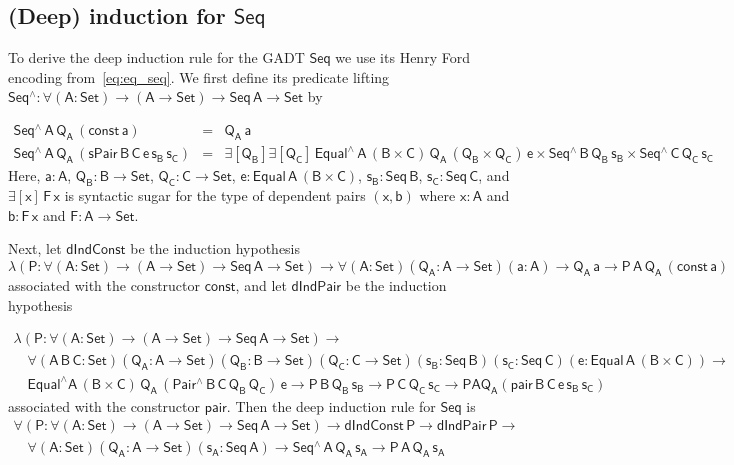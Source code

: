 \documentclass[9pt]{entcs}
\begin{document}
\subsection{(Deep) induction for $\mathsf{Seq}$}\label{sec:ind-seq}

To derive the deep induction rule for the GADT $\mathsf{Seq}$ we use
its Henry Ford encoding from~\eqref{eq:eq_seq}.  We first define its
predicate lifting $\mathsf{Seq^\wedge : \forall (A : Set) \to (A \to
  Set) \to Seq\,A \to Set}$ by

\vspace*{-0.2in}

\[\begin{array}{lll}
\mathsf{Seq^{\wedge}\,A\,Q_A\,(const\,a)} & = & \mathsf{Q_A\,a}\\
\mathsf{Seq^{\wedge}\,A\,Q_A\,(sPair\,B\,C\,e\,s_B\,s_C)}
&=&\mathsf{\exists [Q_B] \exists [Q_C]\, Equal^{\wedge}\,A\, (B
  \times C)\, Q_A\, (Q_B \times Q_C) \, e \times
  Seq^{\wedge}\,B\,Q_B\,s_B \times Seq^{\wedge}\,C\,Q_C\,s_C}
\end{array}\]
Here, $\mathsf{a : A}$, $\mathsf{Q_B : B \to Set}$, $\mathsf{Q_C : C
  \to Set}$, $\mathsf{e : Equal\,A\,(B \times C)}$, $\mathsf{s_B :
  Seq\,B}$, $\mathsf{s_C : Seq\,C}$, and $\mathsf{\exists [x]\, F
  \,x}$ is syntactic sugar for the type of dependent pairs
$\mathsf{(x,b)}$ where $\mathsf{x : A}$ and $\mathsf{b : F\, x}$ and
$\mathsf{F : A \to Set}$.

Next, let $\mathsf{dIndConst}$ be the induction hypothesis
\[\mathsf{
\lambda (P : \forall (A : Set) \to (A \to Set) \to Seq\,A \to Set) \to
\forall (A : Set) (Q_A : A \to Set) (a : A) \to Q_A\,a \to
P\,A\,Q_A\,(const\,a)}\] associated with the constructor
$\mathsf{const}$, and let $\mathsf{dIndPair}$ be the induction
hypothesis

\pagebreak

\[\begin{array}{l}
\mathsf{\lambda (P : \forall (A : Set) \to (A \to Set) \to Seq\,A \to
  Set)} \to \\ 
\quad \mathsf{\forall (A\,B\,C : Set) (Q_A : A \to Set) (Q_B : B
  \to Set) (Q_C : C \to Set)(s_B : Seq\,B) (s_C : Seq\,C) (e :
  Equal\,A\,(B \times C)) \to} \\ 
\quad \mathsf{Equal^{\wedge} A\, (B \times C)\, Q_A\,
  (Pair^{\wedge}\,B\,C\,Q_B\,Q_C)\, e \to P\,B\,Q_B\,s_B \to
  P\,C\,Q_C\,s_C \to P A Q_A ( pair\,B\,C\,e\,s_B\,s_C )}
\end{array}\]
associated with the constructor $\mathsf{pair}$. Then the deep
induction rule for $\mathsf{Seq}$ is
\begin{equation}\label{eq:ind-seq}
\begin{array}{l}
\mathsf{\forall (P : \forall (A : Set) \to (A \to Set) \to Seq\,A \to
  Set)} \mathsf{\to dIndConst\,P \to dIndPair\,P \to} \\ \quad
\mathsf{\forall (A : Set)(Q_A : A \to Set)(s_A : Seq\,A) \to
  Seq^{\wedge}\,A\,Q_A\,s_A \to P\,A\,Q_A\,s_A}
\end{array}
\end{equation}
\end{document}
